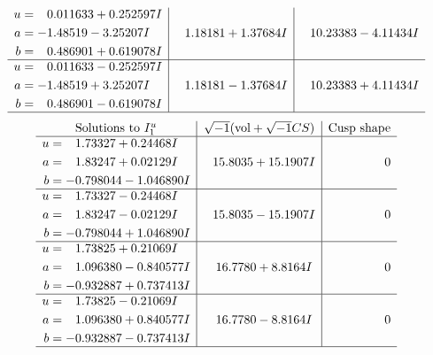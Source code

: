 \documentclass[1p]{elsarticle_modified}
\theoremstyle{definition}
\newcommand{\I}{\sqrt{-1}}
\begin{document}
$$\begin{array}{c|c|c}
\begin{aligned}
u &= \phantom{-}0.011633 + 0.252597 I \\
a &= -1.48519 - 3.25207 I \\
b &= \phantom{-}0.486901 + 0.619078 I\end{aligned}
 & \phantom{-}1.18181 + 1.37684 I & \phantom{-}10.23383 - 4.11434 I \\ \hline\begin{aligned}
u &= \phantom{-}0.011633 - 0.252597 I \\
a &= -1.48519 + 3.25207 I \\
b &= \phantom{-}0.486901 - 0.619078 I\end{aligned}
 & \phantom{-}1.18181 - 1.37684 I & \phantom{-}10.23383 + 4.11434 I\\
 \hline 
 \end{array}$$\newpage$$\begin{array}{c|c|c}  
\text{Solutions to }I^u_{1}& \I (\text{vol} + \sqrt{-1}CS) & \text{Cusp shape}\\
 \hline 
\begin{aligned}
u &= \phantom{-}1.73327 + 0.24468 I \\
a &= \phantom{-}1.83247 + 0.02129 I \\
b &= -0.798044 - 1.046890 I\end{aligned}
 & \phantom{-}15.8035 + 15.1907 I & \phantom{-0.000000 } 0 \\ \hline\begin{aligned}
u &= \phantom{-}1.73327 - 0.24468 I \\
a &= \phantom{-}1.83247 - 0.02129 I \\
b &= -0.798044 + 1.046890 I\end{aligned}
 & \phantom{-}15.8035 - 15.1907 I & \phantom{-0.000000 } 0 \\ \hline\begin{aligned}
u &= \phantom{-}1.73825 + 0.21069 I \\
a &= \phantom{-}1.096380 - 0.840577 I \\
b &= -0.932887 + 0.737413 I\end{aligned}
 & \phantom{-}16.7780 + 8.8164 I & \phantom{-0.000000 } 0 \\ \hline\begin{aligned}
u &= \phantom{-}1.73825 - 0.21069 I \\
a &= \phantom{-}1.096380 + 0.840577 I \\
b &= -0.932887 - 0.737413 I\end{aligned}
 & \phantom{-}16.7780 - 8.8164 I & \phantom{-0.000000 } 0\\
 \hline 
 \end{array}$$\newpage\newpage\renewcommand{\arraystretch}{1}
\end{document}
